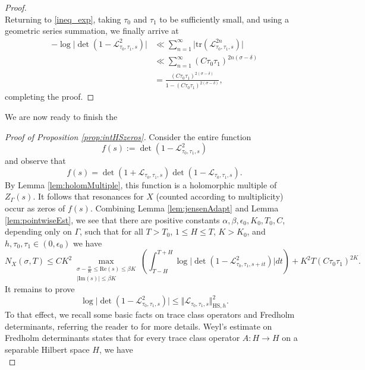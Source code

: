 \documentclass[12pt,letterpaper]{amsart}
\theoremstyle{plain}
\theoremstyle{definition}
\theoremstyle{remark}
\begin{document}
\begin{proof}
$$$$
Returning to \eqref{ineq_exp}, taking $\tau_0$ and $\tau_1$ to be sufficiently small, and using a geometric series summation, we finally arrive at
\begin{align*}
- \log \vert \det( 1- \mathcal{L}_{\tau_0, \tau_1, s}^2)\vert &\ll  \sum_{n=1}^\infty \vert \mathrm{tr}(\mathcal{L}_{\tau_0, \tau_1, s}^{2n})\vert \\
&\ll \sum_{n=1}^\infty (C \tau_0 \tau_1)^{2n(\sigma-\delta) } \\
&= \frac{(C \tau_0 \tau_1)^{2(\sigma-\delta)}}{ 1- (C \tau_0 \tau_1)^{2(\sigma-\delta)}},
\end{align*}
completing the proof.
\end{proof}

We are now ready to finish the

\begin{proof}[Proof of Proposition \ref{prop:intHSzeros}]
Consider the entire function
$$
f(s) := \det( 1- \mathcal{L}_{\tau_0, \tau_1, s}^2)
$$
and observe that
$$
f(s) = \det( 1 + \mathcal{L}_{\tau_0, \tau_1, s}) \det( 1- \mathcal{L}_{\tau_0, \tau_1, s}).
$$
By Lemma \ref{lem:holomMultiple}, this function is a holomorphic multiple of $Z_\Gamma(s)$. It follows that resonances for $X$ (counted according to multiplicity) occur as zeros of $f(s)$. Combining Lemma \ref{lem:jensenAdapt} and Lemma \ref{lem:pointwiseEst}, we see that there are positive constants $\alpha,\beta,\epsilon_0,K_0,T_0,C$, depending only on $\Gamma$, such that for all $T > T_0$, $1\le H \le T$, $K > K_0$, and $h,\tau_0,\tau_1 \in (0,\epsilon_0)$ we have
\begin{equation}\label{ctnzerobeforHS}
N_X(\sigma, T) \le C K^2 \max_{\substack{ \sigma-\frac{\alpha}{K} \le  \mathrm{Re}(s)\le  \beta K \\ \vert \mathrm{Im}(s)\vert \le  \beta K }} \left( \int_{T-H}^{T+H} \log \vert  \det( 1- \mathcal{L}_{\tau_0, \tau_1, s+it}^2) \vert dt \right) +  K^2 T (C\tau_0 \tau_1)^{2K}.
\end{equation}
It remains to prove
$$
\log\vert \det( 1- \mathcal{L}_{\tau_0, \tau_1, s}^2) \vert \le  \Vert \mathcal{L}_{\tau_0, \tau_1, s} \Vert_{\mathrm{HS},h}^2.
$$
To that effect, we recall some basic facts on trace class operators and Fredholm determinants, referring the reader to \cite{Gohberg_Goldberg_Krupnik, Gohberg_Krein, Simon} for more details. Weyl's estimate on Fredholm determinants states that for every trace class operator $A\colon H \to H$ on a separable Hilbert space $H$, we have
\begin{equation}\label{WeylEstgeneral}

\end{equation}
\end{proof}
\end{document}
